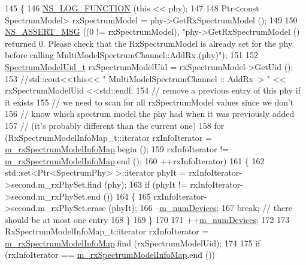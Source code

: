 \begin{DoxyCode}
145 \{
146   \hyperlink{log-macros-disabled_8h_a90b90d5bad1f39cb1b64923ea94c0761}{NS\_LOG\_FUNCTION} (\textcolor{keyword}{this} << phy);
147 
148   Ptr<const SpectrumModel> rxSpectrumModel = phy->GetRxSpectrumModel ();
149 
150   \hyperlink{assert_8h_aff5ece9066c74e681e74999856f08539}{NS\_ASSERT\_MSG} ((0 != rxSpectrumModel), \textcolor{stringliteral}{"phy->GetRxSpectrumModel () returned 0. Please check
       that the RxSpectrumModel is already set for the phy before calling MultiModelSpectrumChannel::AddRx (phy)"});
151 
152   \hyperlink{namespacens3_a5bf0e89b3407bbb59c90a4d8c4cf0a18}{SpectrumModelUid\_t} rxSpectrumModelUid = rxSpectrumModel->GetUid ();
153 \textcolor{comment}{//std::cout<<this<< "  MultiModelSpectrumChannel :: AddRx--> " << rxSpectrumModelUid <<std::endl;}
154   \textcolor{comment}{// remove a previous entry of this phy if it exists}
155   \textcolor{comment}{// we need to scan for all rxSpectrumModel values since we don't}
156   \textcolor{comment}{// know which spectrum model the phy had when it was previously added}
157   \textcolor{comment}{// (it's probably different than the current one)}
158   \textcolor{keywordflow}{for} (RxSpectrumModelInfoMap\_t::iterator rxInfoIterator = 
      \hyperlink{classns3_1_1MultiModelSpectrumChannel_af75faef47b2e879fd82de7364ac2bcd0}{m\_rxSpectrumModelInfoMap}.begin ();
159        rxInfoIterator !=  \hyperlink{classns3_1_1MultiModelSpectrumChannel_af75faef47b2e879fd82de7364ac2bcd0}{m\_rxSpectrumModelInfoMap}.end ();
160        ++rxInfoIterator)
161     \{
162       std::set<Ptr<SpectrumPhy> >::iterator phyIt = rxInfoIterator->second.m\_rxPhySet.find (phy);
163       \textcolor{keywordflow}{if} (phyIt !=  rxInfoIterator->second.m\_rxPhySet.end ())
164         \{
165           rxInfoIterator->second.m\_rxPhySet.erase (phyIt);
166           --\hyperlink{classns3_1_1MultiModelSpectrumChannel_a7f0e7254387c3080acb99e0d51f58700}{m\_numDevices};
167           \textcolor{keywordflow}{break}; \textcolor{comment}{// there should be at most one entry}
168         \}       
169     \}
170 
171   ++\hyperlink{classns3_1_1MultiModelSpectrumChannel_a7f0e7254387c3080acb99e0d51f58700}{m\_numDevices};
172 
173   RxSpectrumModelInfoMap\_t::iterator rxInfoIterator = \hyperlink{classns3_1_1MultiModelSpectrumChannel_af75faef47b2e879fd82de7364ac2bcd0}{m\_rxSpectrumModelInfoMap}.find
       (rxSpectrumModelUid);
174 
175   \textcolor{keywordflow}{if} (rxInfoIterator == \hyperlink{classns3_1_1MultiModelSpectrumChannel_af75faef47b2e879fd82de7364ac2bcd0}{m\_rxSpectrumModelInfoMap}.end ())

\end{DoxyCode}
